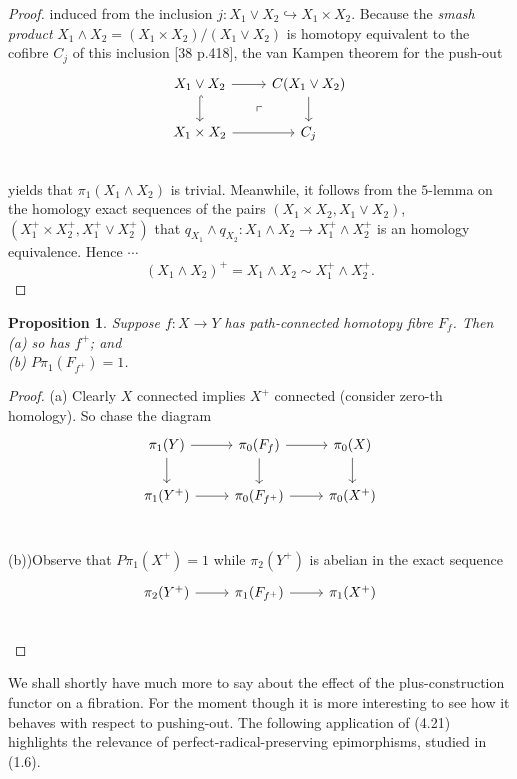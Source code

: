 \documentclass[openany,leqno]{book}  %
\newtheorem{prop}[theorem]{Proposition}
\begin{document}
\begin{proof}
induced from the inclusion $j \colon   X_1\vee X_2 \hookrightarrow X_1\times X_2$. Because the {\em smash product}  $X_1\wedge X_2 = (X_1\times X_2)/(X_1\vee X_2)$ is homotopy equivalent to the cofibre $C_j$ of this inclusion [38 p.418], the van Kampen theorem for the push-out 
\[
\begin{tikzcd}
 X_1\vee X_2 \arrow{r} \arrow[hook]{d} \arrow[dr, phantom, "\ulcorner"] & C(X_1\vee X_2) \arrow{d}\\
 X_1\times X_2 \arrow{r} & C_j\\
 \end{tikzcd}
 \]
yields that $\pi_1(X_1\wedge X_2)$ is trivial. Meanwhile, it follows from the $5$-lemma on the homology exact sequences of the pairs $(X_1\times X_2, X_1\vee X_2)$, $(X_1^+ \times X_2^+ , X_1^+ \vee X_2^+ )$ that $q_{X_1}\wedge q_{X_2}\colon   X_1\wedge X_2 \longrightarrow X_1^+ \wedge X_2^+ $ is an homology equivalence. Hence $\cdots$
\begin{equation}
 	(X_1\wedge X_2)^+ = X_1\wedge X_2 \sim X_1^+ \wedge X_2^+.
 \end{equation} 
\end{proof}
\begin{prop}
	Suppose $f \colon   X\longrightarrow Y$ has path-connected homotopy fibre $F_f$. Then\\
(a) so has $f^+$; and\\
(b) $P\pi_1(F_{f^+})=1$.
\end{prop}
\begin{proof}
(a) Clearly $X$ connected implies $X^+$ connected (consider zero-th homology). So chase the diagram
\[
 \begin{tikzcd}
 \pi_1 (Y) \arrow{r} \arrow{d}& \pi_0(F_{f}) \arrow{r} \arrow{d}&\pi_0(X) \arrow{d} \\
 \pi_1(Y^+) \arrow{r} & \pi_0(F_{f^+})   \arrow{r}              &\pi_0(X^+)  \\
 \end{tikzcd}
 \]

(b))Observe that $P\pi_1(X^+) = 1$ while $\pi_2(Y^+)$ is abelian in the exact sequence
\[
 \begin{tikzcd}
 \pi_2(Y^+) \arrow{r} & \pi_1(F_{f^+})   \arrow{r}              &\pi_1(X^+)  \\
 \end{tikzcd}
 \]

\end{proof}

We shall shortly have much more to say about the effect of the plus-construction functor on a fibration. For the moment though it is more interesting to see how it behaves with respect to
pushing-out. The following application of (4.21) highlights the relevance of perfect-radical-preserving epimorphisms, studied in (1.6).
\end{document}
